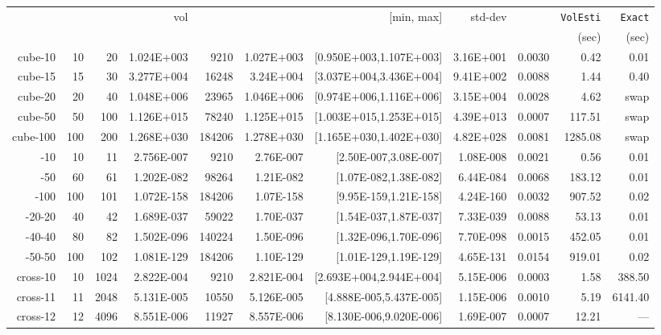 \documentclass[11pt,a4paper]{article}
\def\vol{\mbox{vol}}
\def\vol{\mbox{vol}}
\begin{document}
\begin{table}[t!]\centering\tiny
\begin{tabular*}{\linewidth}{@{\extracolsep{\fill}}r@{\quad}r@{\quad}r@{\quad}r
@{\quad}r@{\quad}r@{\quad}r@{\quad}r@{~}r@{\quad}r@{\quad}r}
 &  &   & \vol &  &  & [min, max]  & std-dev &  
\multirow{2}{*}{} & {\tt VolEsti} & {\tt Exact}\\
& & & & & & & & & (sec) & (sec)\\\hline
cube-10 & 10 & 20 & 1.024E+003 & 9210 & 1.027E+003 & [0.950E+003,1.107E+003] & 3.16E+001 & 0.0030 & 0.42 & 0.01\\
cube-15 & 15 & 30 & 3.277E+004 & 16248 & 3.24E+004 & [3.037E+004,3.436E+004] & 9.41E+002 & 0.0088 & 1.44 & 0.40\\
cube-20 & 20 & 40 & 1.048E+006 & 23965 & 1.046E+006 & [0.974E+006,1.116E+006] & 3.15E+004 & 0.0028 & 4.62 & swap\\
cube-50 & 50 & 100 & 1.126E+015 & 78240 & 1.125E+015 & [1.003E+015,1.253E+015] & 4.39E+013 & 0.0007 & 117.51 & swap\\
cube-100 & 100 & 200 & 1.268E+030 & 184206 & 1.278E+030 & [1.165E+030,1.402E+030] & 4.82E+028 & 0.0081 & 1285.08 & swap\\
-10 & 10 & 11 & 2.756E-007 & 9210 & 2.76E-007 & [2.50E-007,3.08E-007] & 1.08E-008 & 0.0021 & 0.56 & 0.01\\
-50 & 60 & 61 & 1.202E-082 & 98264 & 1.21E-082 & [1.07E-082,1.38E-082] & 6.44E-084 & 0.0068 & 183.12 & 0.01\\
-100 & 100 & 101 & 1.072E-158 & 184206 & 1.07E-158 & [9.95E-159,1.21E-158] & 4.24E-160 & 0.0032 & 907.52 & 0.02\\
-20-20 & 40 & 42 & 1.689E-037 & 59022 & 1.70E-037 & [1.54E-037,1.87E-037] & 7.33E-039 & 0.0088 & 53.13 & 0.01\\
-40-40 & 80 & 82 & 1.502E-096 & 140224 & 1.50E-096 & [1.32E-096,1.70E-096] & 7.70E-098 & 0.0015 & 452.05 & 0.01\\
-50-50 & 100 & 102 & 1.081E-129 & 184206 & 1.10E-129 & [1.01E-129,1.19E-129] & 4.65E-131 & 0.0154 & 919.01 & 0.02\\
cross-10 & 10 & 1024 & 2.822E-004 & 9210 & 2.821E-004 & [2.693E+004,2.944E+004] & 5.15E-006 & 0.0003 & 1.58 & 388.50\\
cross-11 & 11 & 2048 & 5.131E-005 & 10550 & 5.126E-005 & [4.888E-005,5.437E-005] & 1.15E-006 & 0.0010 & 5.19 & 6141.40\\
cross-12 & 12 & 4096 & 8.551E-006 & 11927 & 8.557E-006 & [8.130E-006,9.020E-006] & 1.69E-007 & 0.0007 & 12.21 & ---\\

\end{tabular*}
\end{table}
\end{document}
